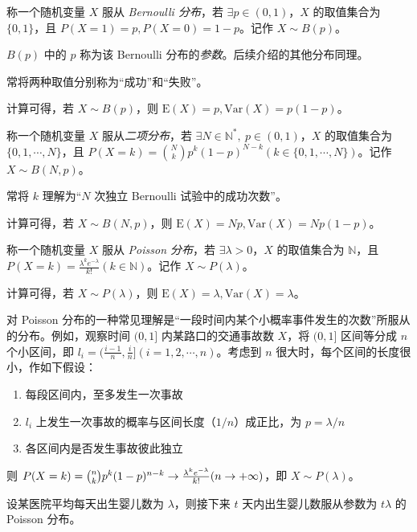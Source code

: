 \documentclass[../main.tex]{subfiles}
\begin{document}
\begin{definition}\label{def:2.3.1}
    称一个随机变量 $X$ 服从 \emph{Bernoulli 分布}，若 $\exists p\in(0,1)$，$X$ 的取值集合为 $\{0,1\}$，且 $P(X=1)=p,P(X=0)=1-p$。记作 $X\sim B(p)$。
\end{definition}

$B(p)$ 中的 $p$ 称为该 Bernoulli 分布的\emph{参数}。后续介绍的其他分布同理。

常将两种取值分别称为“成功”和“失败”。

计算可得，若 $X\sim B(p)$，则 $\mathrm{E}(X)=p,\mathrm{Var}(X)=p(1-p)$。

\begin{definition}\label{def:2.3.2}
    称一个随机变量 $X$ 服从\emph{二项分布}，若 $\exists N\in\mathbb{N}^*,\ p\in(0,1)$，$X$ 的取值集合为 $\{0,1,\cdots,N\}$，且 $P(X=k)=\binom{N}{k}p^k(1-p)^{N-k}(k\in\{0,1,\cdots,N\})$。记作 $X\sim B(N,p)$。
\end{definition}

常将 $k$ 理解为“$N$ 次独立 Bernoulli 试验中的成功次数”。

计算可得，若 $X\sim B(N,p)$，则 $\mathrm{E}(X)=Np,\mathrm{Var}(X)=Np(1-p)$。

\begin{definition}\label{def:2.3.3}
    称一个随机变量 $X$ 服从 \emph{Poisson 分布}，若 $\exists\lambda>0$，$X$ 的取值集合为 $\mathbb{N}$，且 $P(X=k)=\frac{\lambda^ke^{-\lambda}}{k!}(k\in\mathbb{N})$。记作 $X\sim P(\lambda)$。
\end{definition}

计算可得，若 $X\sim P(\lambda)$，则 $\mathrm{E}(X)=\lambda,\mathrm{Var}(X)=\lambda$。

对 Poisson 分布的一种常见理解是“一段时间内某个小概率事件发生的次数”所服从的分布。例如，观察时间 $(0,1]$ 内某路口的交通事故数 $X$，将 $(0,1]$ 区间等分成 $n$ 个小区间，即 $l_i=(\frac{i-1}{n},\frac{i}{n}](i=1,2,\cdots,n)$。考虑到 $n$ 很大时，每个区间的长度很小，作如下假设：
\begin{enumerate}
    \item 每段区间内，至多发生一次事故
    \item $l_i$ 上发生一次事故的概率与区间长度（$1/n$）成正比，为 $p=\lambda/n$
    \item 各区间内是否发生事故彼此独立
\end{enumerate}

则 $P(X=k)=\tbinom{n}{k}p^k(1-p)^{n-k}\rightarrow \frac{\lambda^ke^{-\lambda}}{k!}(n\rightarrow+\infty)$，即 $X\sim P(\lambda)$。

\begin{example}
    设某医院平均每天出生婴儿数为 $\lambda$，则接下来 $t$ 天内出生婴儿数服从参数为 $t\lambda$ 的 Poisson 分布。
\end{example}
\end{document}
